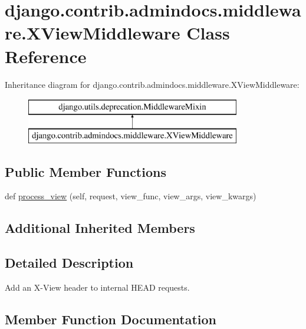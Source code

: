 \hypertarget{classdjango_1_1contrib_1_1admindocs_1_1middleware_1_1_x_view_middleware}{}\section{django.\+contrib.\+admindocs.\+middleware.\+X\+View\+Middleware Class Reference}
\label{classdjango_1_1contrib_1_1admindocs_1_1middleware_1_1_x_view_middleware}
Inheritance diagram for django.\+contrib.\+admindocs.\+middleware.\+X\+View\+Middleware\+:\begin{figure}[H]
\begin{center}
\leavevmode
\includegraphics[height=2.000000cm]{classdjango_1_1contrib_1_1admindocs_1_1middleware_1_1_x_view_middleware}
\end{center}
\end{figure}
\subsection*{Public Member Functions}
\begin{DoxyCompactItemize}
\item 
def \mbox{\hyperlink{classdjango_1_1contrib_1_1admindocs_1_1middleware_1_1_x_view_middleware_a92284652f769e6b963f5b4c502bd495c}{process\+\_\+view}} (self, request, view\+\_\+func, view\+\_\+args, view\+\_\+kwargs)
\end{DoxyCompactItemize}
\subsection*{Additional Inherited Members}


\subsection{Detailed Description}
\begin{DoxyVerb}Add an X-View header to internal HEAD requests.
\end{DoxyVerb}
 

\subsection{Member Function Documentation}
\mbox{\label{classdjango_1_1contrib_1_1admindocs_1_1middleware_1_1_x_view_middleware_a92284652f769e6b963f5b4c502bd495c}} 
